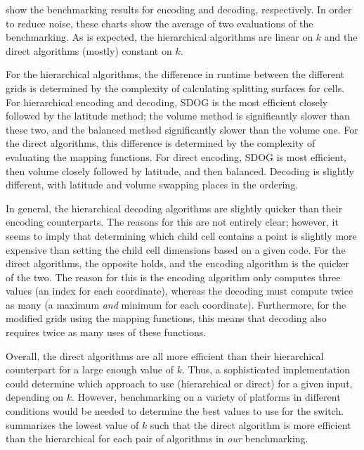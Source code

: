  show the benchmarking results for encoding and decoding, respectively.
In order to reduce noise, these charts show the average of two evaluations of the benchmarking.
As is expected, the hierarchical algorithms are linear on $k$ and the direct algorithms (mostly) constant on $k$.


For the hierarchical algorithms, the difference in runtime between the different grids is determined by the complexity of calculating splitting surfaces for cells.
For hierarchical encoding and decoding, SDOG is the most efficient closely followed by the latitude method; the volume method is significantly slower than these two, and the balanced method significantly slower than the volume one.
For the direct algorithms, this difference is determined by the complexity of evaluating the mapping functions.
For direct encoding, SDOG is most efficient, then volume closely followed by latitude, and then balanced.
Decoding is slightly different, with latitude and volume swapping places in the ordering.


In general, the hierarchical decoding algorithms are slightly quicker than their encoding counterparts.
The reasons for this are not entirely clear; however, it seems to imply that determining which child cell contains a point is slightly more expensive than setting the child cell dimensions based on a given code.
For the direct algorithms, the opposite holds, and the encoding algorithm is the quicker of the two.
The reason for this is the encoding algorithm only computes three values (an index for each coordinate), whereas the decoding must compute twice as many (a maximum \textit{and} minimum for each coordinate).
Furthermore, for the modified grids using the mapping functions, this means that decoding also requires twice as many uses of these functions.


Overall, the direct algorithms are all more efficient than their hierarchical counterpart for a large enough value of $k$.
Thus, a sophisticated implementation could determine which approach to use (hierarchical or direct) for a given input, depending on $k$.
However, benchmarking on a variety of platforms in different conditions would be needed to determine the best values to use for the switch.
 summarizes the lowest value of $k$ such that the direct algorithm is more efficient than the hierarchical for each pair of algorithms in \textit{our} benchmarking.


